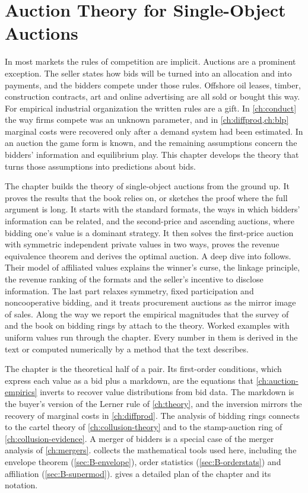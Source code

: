 \chapter{Auction Theory for Single-Object Auctions}\label{ch:auction-theory}

In most markets the rules of competition are implicit. Auctions are a prominent exception. The seller states how bids
will be turned into an allocation and into payments, and the bidders compete under those rules. Offshore oil leases, timber,
construction contracts, art and online advertising are all sold or bought this way. For empirical industrial
organization the written rules are a gift. In \cref{ch:conduct} the way firms compete was an unknown parameter,
and in \cref{ch:diffprod,ch:blp} marginal costs were recovered only after a demand system had been estimated.
In an auction the game form is known, and the remaining assumptions concern the bidders' information and
equilibrium play. This chapter develops the theory that turns those assumptions into predictions about bids.

The chapter builds the theory of single-object auctions from the ground up. It proves the results that the
book relies on, or sketches the proof where the full argument is long. It starts with the standard formats, the ways in which bidders' information can be related, and
the second-price and ascending auctions, where bidding one's value is a dominant strategy. It then solves the
first-price auction with symmetric independent private values in two ways, proves the revenue equivalence
theorem and derives the optimal auction. A deep dive into \citet{MilgromWeber1982} follows. Their model of
affiliated values explains the winner's curse, the linkage principle, the revenue ranking of the formats and
the seller's incentive to disclose information. The last part relaxes symmetry, fixed participation and
noncooperative bidding, and it treats procurement auctions as the mirror image of sales. Along the way we
report the empirical magnitudes that the survey of \citet{HortacsuPerrigne2021} and the book on bidding rings
by \citet{MarshallMarx2012} attach to the theory. Worked examples with
uniform values run through the chapter. Every number in them is derived in the text or computed numerically
by a method that the text describes.

The chapter is the theoretical half of a pair. Its first-order conditions, which express each value as a bid
plus a markdown, are the equations that \cref{ch:auction-empirics} inverts to recover value distributions from
bid data. The markdown is the buyer's version of the Lerner rule of \cref{ch:theory}, and the inversion mirrors
the recovery of marginal costs in \cref{ch:diffprod}. The analysis of bidding rings connects to the cartel
theory of \cref{ch:collusion-theory} and to the stamp-auction ring of \cref{ch:collusion-evidence}. A merger of
bidders is a special case of the merger analysis of \cref{ch:mergers}.  collects the
mathematical tools used here, including the envelope theorem (\cref{sec:B-envelope}), order statistics
(\cref{sec:B-orderstats}) and affiliation (\cref{sec:B-supermod}).
 gives a detailed plan of the chapter and its notation.

